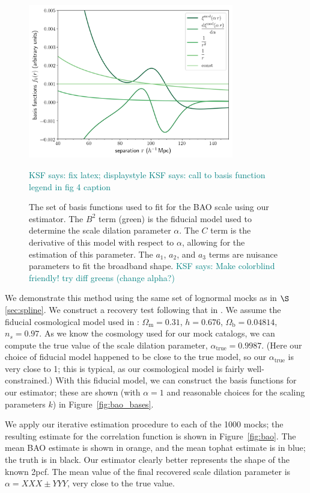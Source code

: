 \documentclass[modern]{aastex62}
\newcommand{\cf}{2pcf\xspace} %
\newcommand{\KSF}[1]{\textcolor{teal}{KSF says: #1}}
\begin{document}
\label{fig:bao_bases}
\begin{figure}[ht]
\centering
    \includegraphics[width=0.8\textwidth]{bao_bases}
    \caption{The set of basis functions used to fit for the BAO scale using our estimator. The $B^2$ term (green) is the fiducial model used to determine the scale dilation parameter $\alpha$. The $C$ term is the derivative of this model with respect to $\alpha$, allowing for the estimation of this parameter. The $a_1$, $a_2$, and $a_3$ terms are nuisance parameters to fit the broadband shape. \KSF{Make colorblind friendly! try diff greens (change alpha?)}} \KSF{fix latex; displaystyle} \KSF{call to basis function legend in fig 4 caption}
\end{figure}

We demonstrate this method using the same set of lognormal mocks as in $\S$\ref{sec:spline}.
We construct a recovery test following that in \cite{Hinton2019}.
We assume the fiducial cosmological model used in \cite{Beutler2017}: $\Omega_{\text{m}} = 0.31$, $h = 0.676$, $\Omega_{\text{b}} = 0.04814$, $n_s = 0.97$. 
As we know the cosmology used for our mock catalogs, we can compute the true value of the scale dilation parameter, $\alpha_{\text{true}}=0.9987$.
(Here our choice of fiducial model happened to be close to the true model, so our $\alpha_{\text{true}}$ is very close to 1; this is typical, as our cosmological model is fairly well-constrained.)
With this fiducial model, we can construct the basis functions for our estimator; these are shown (with $\alpha=1$ and reasonable choices for the scaling parameters $k$) in Figure~\ref{fig:bao_bases}.

We apply our iterative estimation procedure to each of the 1000 mocks; the resulting estimate for the correlation function is shown in Figure~\ref{fig:bao}.
The mean BAO estimate is shown in orange, and the mean tophat estimate is in blue; the truth is in black.
Our estimator clearly better represents the shape of the known \cf.
The mean value of the final recovered scale dilation parameter is $\alpha=XXX \pm YYY$, very close to the true value.
\end{document}
